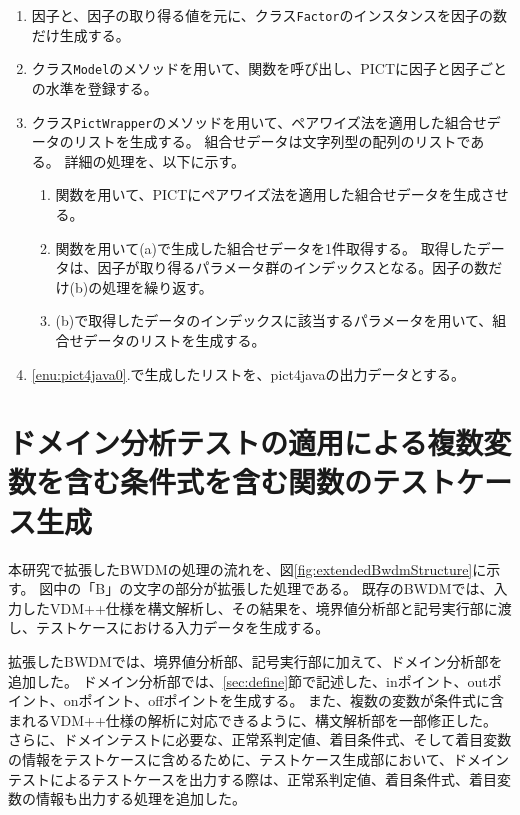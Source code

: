 \documentclass[uplatex, report, a4j, 10pt]{jsbook}
\newcommand\ttt[1]{\texttt{#1}}
\begin{document}
\begin{enumerate}
  \item 因子と、因子の取り得る値を元に、クラス\ttt{Factor}のインスタンスを因子の数だけ生成する。
  \item クラス\ttt{Model}の\addFactor{}メソッドを用いて、\PictAddParameter{}関数を呼び出し、PICTに因子と因子ごとの水準を登録する。
  \item\label{enu:pict4java0} クラス\ttt{PictWrapper}の\generate{}メソッドを用いて、ペアワイズ法を適用した組合せデータのリストを生成する。
        組合せデータは文字列型の配列のリストである。
        詳細の処理を、以下に示す。
        \begin{enumerate}
          \item\label{enu:pict4java1} \PictGenerate{}関数を用いて、PICTにペアワイズ法を適用した組合せデータを生成させる。
          \item\label{enu:pict4java2} \PictGetNextResultRow{}関数を用いて(a)で生成した組合せデータを1件取得する。
                取得したデータは、因子が取り得るパラメータ群のインデックスとなる。因子の数だけ(b)の処理を繰り返す。
          \item (b)で取得したデータのインデックスに該当するパラメータを用いて、組合せデータのリストを生成する。
        \end{enumerate}
  \item \ref{enu:pict4java0}.で生成したリストを、pict4javaの出力データとする。
\end{enumerate}

\section{ドメイン分析テストの適用による複数変数を含む条件式を含む関数のテストケース生成}\label{sec:extendDomain}

本研究で拡張したBWDMの処理の流れを、図\ref{fig:extendedBwdmStructure}に示す。
図中の「B」の文字の部分が拡張した処理である。
既存のBWDMでは、入力したVDM++仕様を構文解析し、その結果を、境界値分析部と記号実行部に渡し、テストケースにおける入力データを生成する。

拡張したBWDMでは、境界値分析部、記号実行部に加えて、ドメイン分析部を追加した。
ドメイン分析部では、\ref{sec:define}節で記述した、inポイント、outポイント、onポイント、offポイントを生成する。
また、複数の変数が条件式に含まれるVDM++仕様の解析に対応できるように、構文解析部を一部修正した。
さらに、ドメインテストに必要な、正常系判定値、着目条件式、そして着目変数の情報をテストケースに含めるために、テストケース生成部において、ドメインテストによるテストケースを出力する際は、正常系判定値、着目条件式、着目変数の情報も出力する処理を追加した。
\end{document}
